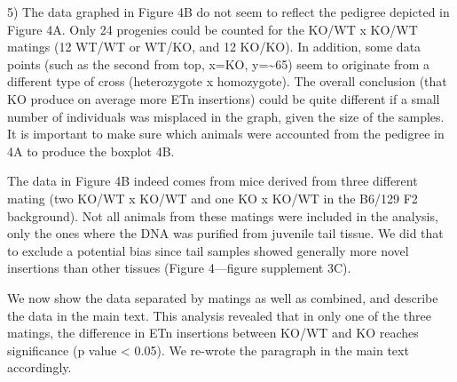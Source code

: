 \documentclass[11pt,a4paper]{article}
\begin{document}
5) The data graphed in Figure 4B do not seem to reflect the pedigree depicted in Figure 4A. Only 24 progenies could be counted for the KO/WT x KO/WT matings (12 WT/WT or WT/KO, and 12 KO/KO). In addition, some data points (such as the second from top, x=KO, y=\textasciitilde{}65) seem to originate from a different type of cross (heterozygote x homozygote). The overall conclusion (that KO produce on average more ETn insertions) could be quite different if a small number of individuals was misplaced in the graph, given the size of the samples. It is important to make sure which animals were accounted from the pedigree in 4A to produce the boxplot 4B.

The data in Figure 4B indeed comes from mice derived from three different mating (two KO/WT x KO/WT and one KO x KO/WT in the B6/129 F2 background). Not all animals from these matings were included in the analysis, only the ones where the DNA was purified from juvenile tail tissue. We did that to exclude a potential bias since tail samples showed generally more novel insertions than other tissues (Figure 4—figure supplement 3C).

We now show the data separated by matings as well as combined, and describe the data in the main text. This analysis revealed that in only one of the three matings, the difference in ETn insertions between KO/WT and KO reaches significance (p value < 0.05). We re-wrote the paragraph in the main text accordingly.
\end{document}
